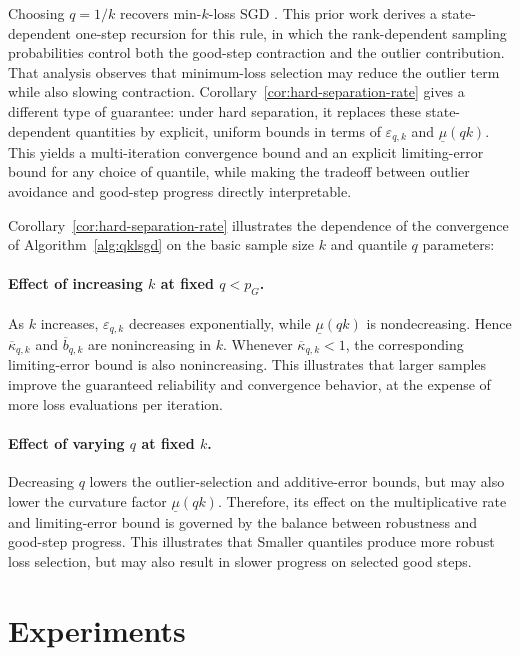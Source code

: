 \documentclass[11pt]{article}
\begin{document}
Choosing \(q=1/k\) recovers min-\(k\)-loss SGD
\citep{shah2020choosing}. This prior work derives a state-dependent one-step
recursion for this rule, in which the rank-dependent sampling probabilities
control both the good-step contraction and the outlier contribution. That
analysis observes that minimum-loss selection may reduce the outlier term
while also slowing contraction. Corollary~\ref{cor:hard-separation-rate} gives a different type of
guarantee: under hard separation, it replaces these state-dependent
quantities by explicit, uniform bounds in terms of
\(\varepsilon_{q,k}\) and \(\underline{\mu}(qk)\). This yields a
multi-iteration convergence bound and an explicit limiting-error bound for
any choice of quantile, while making the tradeoff between outlier avoidance
and good-step progress directly interpretable.

Corollary~\ref{cor:hard-separation-rate} illustrates the dependence of the convergence of Algorithm~\ref{alg:qklsgd} on the basic sample size $k$ and quantile $q$ parameters:

\paragraph{Effect of increasing \(k\) at fixed \(q<p_G\).}
As \(k\) increases, \(\varepsilon_{q,k}\) decreases exponentially, while
\(\underline{\mu}(qk)\) is nondecreasing. Hence
\(\overline{\kappa}_{q,k}\) and \(\overline b_{q,k}\) are nonincreasing in
\(k\). Whenever \(\overline{\kappa}_{q,k}<1\), the corresponding
limiting-error bound is also nonincreasing. This illustrates that larger samples improve the
guaranteed reliability and convergence behavior, at the expense of more loss
evaluations per iteration.

\paragraph{Effect of varying \(q\) at fixed \(k\).}
Decreasing \(q\) lowers the outlier-selection and additive-error bounds, but
may also lower the curvature factor \(\underline{\mu}(qk)\). Therefore, its
effect on the multiplicative rate and limiting-error bound is governed by the
balance between robustness and good-step progress. This illustrates that Smaller quantiles produce
more robust loss selection, but may also result in slower progress on selected good
steps.


\section{Experiments}\label{sec:numerics}
\end{document}

